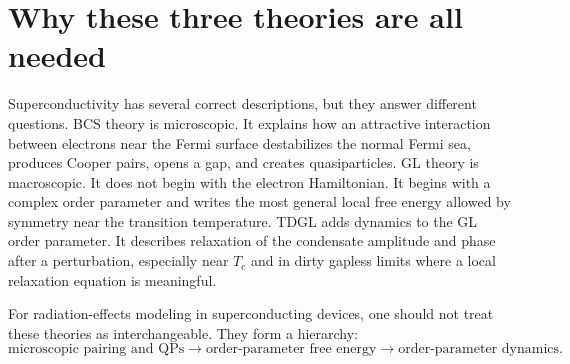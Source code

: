 \documentclass[11pt]{article}
\numberwithin{equation}{section}
\newcommand{\Tc}{T_{\mathrm{c}}}
\begin{document}
\section{Why these three theories are all needed}

Superconductivity has several correct descriptions, but they answer different questions. BCS theory is microscopic. It explains how an attractive interaction between electrons near the Fermi surface destabilizes the normal Fermi sea, produces Cooper pairs, opens a gap, and creates quasiparticles. GL theory is macroscopic. It does not begin with the electron Hamiltonian. It begins with a complex order parameter and writes the most general local free energy allowed by symmetry near the transition temperature. TDGL adds dynamics to the GL order parameter. It describes relaxation of the condensate amplitude and phase after a perturbation, especially near $\Tc$ and in dirty gapless limits where a local relaxation equation is meaningful.

For radiation-effects modeling in superconducting devices, one should not treat these theories as interchangeable. They form a hierarchy:
\begin{equation}
\boxed{\text{microscopic pairing and QPs} \longrightarrow \text{order-parameter free energy} \longrightarrow \text{order-parameter dynamics}.}
\end{equation}

\begin{center}
\end{center}
\end{document}
